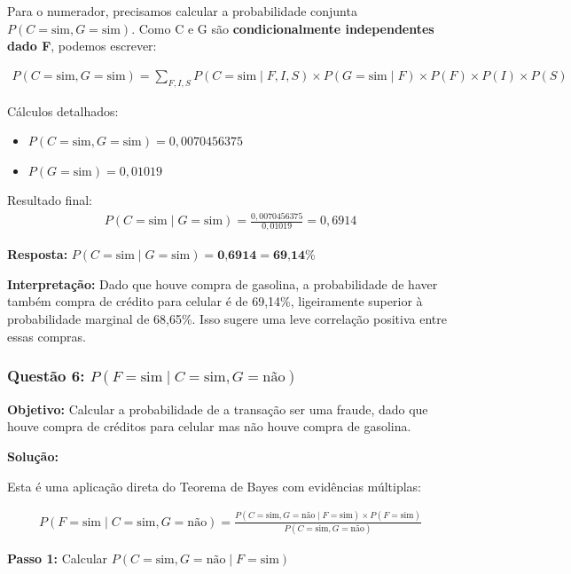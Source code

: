 \documentclass[a4paper,12pt]{article}
\begin{document}
Para o numerador, precisamos calcular a probabilidade conjunta $P(C=\text{sim}, G=\text{sim})$. Como C e G são \textbf{condicionalmente independentes dado F}, podemos escrever:

\begin{align}
P(C=\text{sim}, G=\text{sim}) = \sum_{F,I,S} P(C=\text{sim} \mid F,I,S) \times P(G=\text{sim} \mid F) \times P(F) \times P(I) \times P(S)
\end{align}

Cálculos detalhados:
\begin{itemize}
    \item $P(C=\text{sim}, G=\text{sim}) = 0,0070456375$
    \item $P(G=\text{sim}) = 0,01019$
\end{itemize}

Resultado final:
\begin{align}
P(C=\text{sim} \mid G=\text{sim}) = \frac{0,0070456375}{0,01019} = 0,6914
\end{align}

\textbf{Resposta:} $P(C=\text{sim} \mid G=\text{sim}) = \textbf{0,6914} = \textbf{69,14\%}$

\textbf{Interpretação:} Dado que houve compra de gasolina, a probabilidade de haver também compra de crédito para celular é de 69,14\%, ligeiramente superior à probabilidade marginal de 68,65\%. Isso sugere uma leve correlação positiva entre essas compras.

\subsubsection{Questão 6: \texorpdfstring{$P(F=\text{sim} \mid C=\text{sim}, G=\text{não})$}{P(F=sim | C=sim, G=não)}}

\textbf{Objetivo:} Calcular a probabilidade de a transação ser uma fraude, dado que houve compra de créditos para celular mas não houve compra de gasolina.

\textbf{Solução:}

Esta é uma aplicação direta do Teorema de Bayes com evidências múltiplas:

\begin{align}
P(F=\text{sim} \mid C=\text{sim}, G=\text{não}) = \frac{P(C=\text{sim}, G=\text{não} \mid F=\text{sim}) \times P(F=\text{sim})}{P(C=\text{sim}, G=\text{não})}
\end{align}

\textbf{Passo 1:} Calcular $P(C=\text{sim}, G=\text{não} \mid F=\text{sim})$
\end{document}
